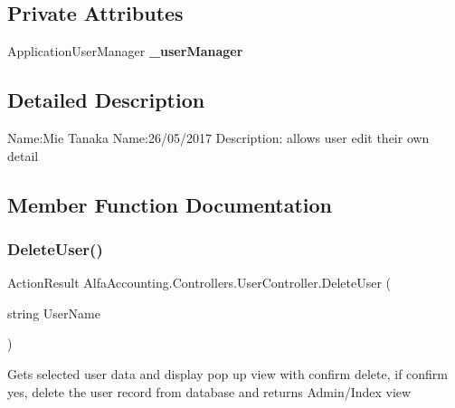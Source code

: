 \subsection*{Private Attributes}
\begin{DoxyCompactItemize}
\item 
\mbox{\label{class_alfa_accounting_1_1_controllers_1_1_user_controller_a3d027fc8d76aa1a298f6b1a615a06e05}} 
Application\+User\+Manager {\bfseries \+\_\+user\+Manager}
\end{DoxyCompactItemize}


\subsection{Detailed Description}
Name\+:Mie Tanaka Name\+:26/05/2017 Description\+: allows user edit their own detail 



\subsection{Member Function Documentation}
\mbox{\label{class_alfa_accounting_1_1_controllers_1_1_user_controller_ae790d18ac9ac914e2e6cde9174b0f03b}} 
\subsubsection{\texorpdfstring{Delete\+User()}{DeleteUser()}\hspace{0.1cm}{\footnotesize\ttfamily [1/2]}}
{\footnotesize\ttfamily Action\+Result Alfa\+Accounting.\+Controllers.\+User\+Controller.\+Delete\+User (\begin{DoxyParamCaption}\item[{string}]{User\+Name }\end{DoxyParamCaption})}



Gets selected user data and display pop up view with confirm delete, if confirm yes, delete the user record from database and returns Admin/\+Index view 


